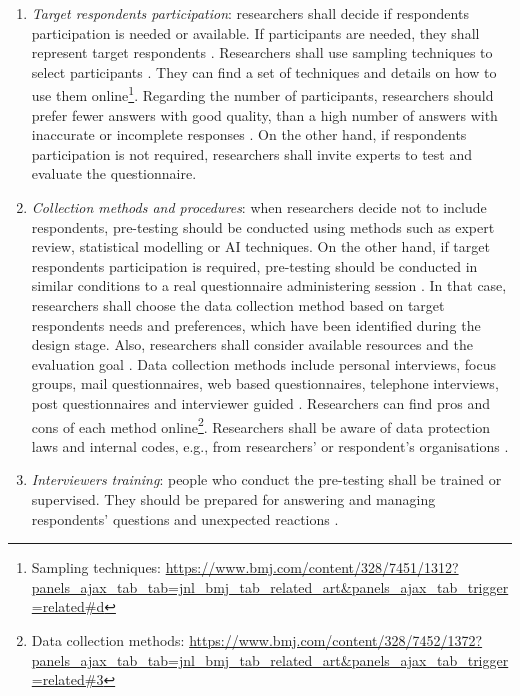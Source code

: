 \begin{enumerate}
    \item \emph{Target respondents participation}: researchers shall decide if respondents participation is needed or available. If participants are needed, they shall represent target respondents \cite{Krosnick2009,Boynton2004}.
    Researchers shall use sampling techniques to select participants \cite{Boynton2004c,Diem,Radhakrishna2007}. They can find a set of techniques and details on how to use them online\footnote{Sampling techniques: \url{https://www.bmj.com/content/328/7451/1312?panels_ajax_tab_tab=jnl_bmj_tab_related_art&panels_ajax_tab_trigger=related\#d}}.
    Regarding the number of participants, researchers should prefer fewer answers with good quality, than a high number of answers with inaccurate or incomplete responses \cite{Boynton2004}. On the other hand, if respondents participation is not required, researchers shall invite experts to test and evaluate the questionnaire.
    
    \item \emph{Collection methods and procedures}: when researchers decide not to include respondents, pre-testing should be conducted using methods such as expert review, statistical modelling or \ac{AI} techniques. On the other hand, if target respondents participation is required, pre-testing should be conducted in similar conditions to a real questionnaire administering session \cite{Krosnick2009}. In that case, researchers shall choose the data collection method based on target respondents needs and preferences, which have been identified during the design stage. Also, researchers shall consider available resources and the evaluation goal \cite{Boynton2004}.
    Data collection methods include personal interviews, focus groups, mail questionnaires, web based questionnaires, telephone interviews, post questionnaires and interviewer guided \cite{Crawford1997,Diem,Boynton2004}. Researchers can find pros and cons of each method online\footnote{Data collection methods: \url{https://www.bmj.com/content/328/7452/1372?panels_ajax_tab_tab=jnl_bmj_tab_related_art&panels_ajax_tab_trigger=related\#3}}.
    Researchers shall be aware of data protection laws and internal codes, e.g., from researchers' or respondent's organisations \cite{Boynton2004}.
    
    \item \emph{Interviewers training}: people who conduct the pre-testing shall be trained or supervised. They should be prepared for answering and managing respondents' questions and unexpected reactions \cite{Boynton2004b}.
\end{enumerate}

